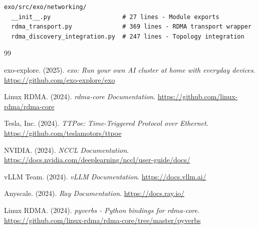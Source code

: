 \documentclass[10pt,letterpaper]{article}
\begin{document}
\begin{lstlisting}
exo/src/exo/networking/
  __init__.py                    # 27 lines - Module exports
  rdma_transport.py              # 369 lines - RDMA transport wrapper
  rdma_discovery_integration.py  # 247 lines - Topology integration
\end{lstlisting}

\begin{thebibliography}{99}

exo-explore. (2025). \textit{exo: Run your own AI cluster at home with everyday devices}. \url{https://github.com/exo-explore/exo}

Linux RDMA. (2024). \textit{rdma-core Documentation}. \url{https://github.com/linux-rdma/rdma-core}

Tesla, Inc. (2024). \textit{TTPoe: Time-Triggered Protocol over Ethernet}. \url{https://github.com/teslamotors/ttpoe}

NVIDIA. (2024). \textit{NCCL Documentation}. \url{https://docs.nvidia.com/deeplearning/nccl/user-guide/docs/}

vLLM Team. (2024). \textit{vLLM Documentation}. \url{https://docs.vllm.ai/}

Anyscale. (2024). \textit{Ray Documentation}. \url{https://docs.ray.io/}

Linux RDMA. (2024). \textit{pyverbs - Python bindings for rdma-core}. \url{https://github.com/linux-rdma/rdma-core/tree/master/pyverbs}

\end{thebibliography}
\end{document}
